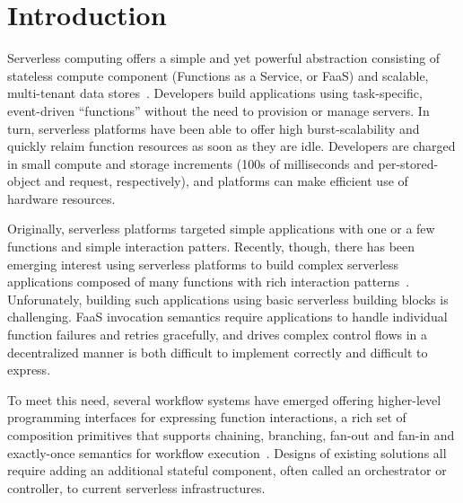 \section{Introduction}

Serverless computing offers a simple and yet powerful abstraction consisting of
stateless compute component (Functions as a Service, or FaaS) and scalable,
multi-tenant data stores~\cite{berkeley}. Developers build applications using
task-specific, event-driven ``functions'' without the need to provision or
manage servers. In turn, serverless platforms have been able to offer high
burst-scalability and quickly relaim function resources as soon as they are
idle. Developers are charged in small compute and storage increments (100s of
milliseconds and per-stored-object and request, respectively), and platforms
can make efficient use of hardware resources.

Originally, serverless platforms targeted simple applications with one or a few
functions and simple interaction patters. Recently, though, there has been
emerging interest using serverless platforms to build complex serverless
applications composed of many functions with rich interaction
patterns~\cite{excamera, pywren, gg-atc, beldi, boki}. Unforunately, building
such applications using basic serverless building blocks is challenging. FaaS
invocation semantics require applications to handle individual function
failures and retries gracefully, and drives complex control flows in a
decentralized manner is both difficult to implement correctly and difficult to
express.


To meet this need, several workflow systems have emerged offering
higher-level programming interfaces for expressing function interactions, a
rich set of composition primitives that supports chaining, branching, fan-out
and fan-in and exactly-once semantics for workflow execution~\cite{excamera,
gg-atc, aws-step-functions, google-cloud-composer, google-workflows,
durable-functions}. Designs of existing solutions all require adding an
additional stateful component, often called an orchestrator or controller, to
current serverless infrastructures.

